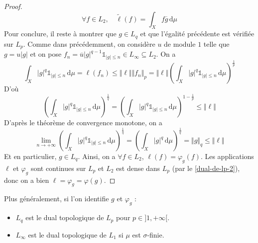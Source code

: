 \begin{proof}
    \[ \forall f \in L_2, \quad \widetilde{\ell}(f) = \int_X f \overline{g} \, \mathrm{d}\mu \]
    Pour conclure, il reste à montrer que $g \in L_q$ et que l'égalité précédente est vérifiée sur $L_p$. Comme dans précédemment, on considère $u$ de module $1$ telle que $g = u \vert g \vert$ et on pose $f_n = \overline{u} \vert g \vert^{q-1} \mathbb{1}_{\vert g \vert \leq n} \in L_\infty \subseteq L_2$. On a
    \[ \int_X \vert g \vert^q \mathbb{1}_{\vert g \vert \leq n} \, \mathrm{d}\mu = \ell(f_n) \leq \Vert \ell \Vert \Vert f_n \Vert_p = \Vert \ell \Vert \left ( \int_X \vert g \vert^q \mathbb{1}_{\vert g \vert \leq n} \, \mathrm{d}\mu \right )^{\frac{1}{p}} \]
    D'où
    \[ \left ( \int_X \vert g \vert^q \mathbb{1}_{\vert g \vert \leq n} \, \mathrm{d}\mu \right )^{\frac{1}{q}} = \left ( \int_X \vert g \vert^q \mathbb{1}_{\vert g \vert \leq n} \, \mathrm{d}\mu \right )^{1 - \frac{1}{p}} \leq \Vert \ell \Vert \]
    D'après le théorème de convergence monotone, on a
    \[ \lim_{n \rightarrow +\infty} \left ( \int_X \vert g \vert^q \mathbb{1}_{\vert g \vert \leq n} \, \mathrm{d}\mu \right )^{\frac{1}{q}} = \left ( \int_X \vert g \vert^q \, \mathrm{d}\mu \right )^{\frac{1}{q}} = \Vert g \Vert_q \leq \Vert \ell \Vert \]
    Et en particulier, $g \in L_q$. Ainsi, on a $\forall f \in L_2$, $\ell(f) = \varphi_g(f)$. Les applications $\ell$ et $\varphi_g$ sont continues sur $L_p$ et $L_2$ est dense dans $L_p$ (par le \cref{dual-de-lp-2}), donc on a bien $\ell = \varphi_g = \varphi(g)$.
  \end{proof}


  \begin{remark}
    Plus généralement, si l'on identifie $g$ et $\varphi_g$ :
    \begin{itemize}
      \item $L_q$ est le dual topologique de $L_p$ pour $p \in ]1, +\infty[$.
      \item $L_\infty$ est le dual topologique de $L_1$ si $\mu$ est $\sigma$-finie.
    \end{itemize}
  \end{remark}

